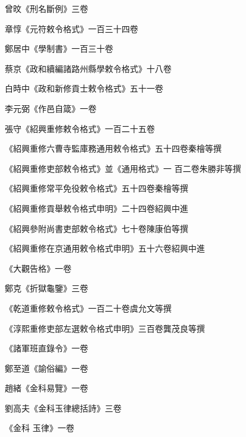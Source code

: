 \begin{pinyinscope}
 曾旼《刑名斷例》三卷



 章惇《元符敕令格式》一百三十四卷



 鄭居中《學制書》一百三十卷



 蔡京《政和續編諸路州縣學敕令格式》十八卷



 白時中《政和新修貢士敕令格式》五十一卷



 李元弼《作邑自箴》一卷



 張守《紹興重修敕令格式》一百二十五卷



 《紹興重修六曹寺監庫務通用敕令格式》五十四卷秦檜等撰



 《紹興重修吏部敕令格式》並《通用格式》一
 百二卷朱勝非等撰



 《紹興重修常平免役敕令格式》五十四卷秦檜等撰



 《紹興重修貢舉敕令格式申明》二十四卷紹興中進



 《紹興參附尚書吏部敕令格式》七十卷陳康伯等撰



 《紹興重修在京通用敕令格式申明》五十六卷紹興中進



 《大觀告格》一卷



 鄭克《折獄龜鑒》三卷



 《乾道重修敕令格式》一百二十卷虞允文等撰



 《淳熙重修吏部左選敕令格式申明》三百卷龔茂良等撰



 《諸軍班直錄令》一卷



 鄭至道《諭俗編》一卷



 趙緒《金科易覽》一卷



 劉高夫《金科玉律總括詩》三卷



 《金科
 玉律》一卷




\end{pinyinscope}
